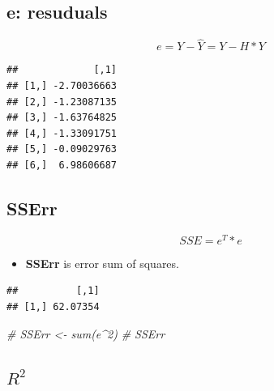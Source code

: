 \documentclass[
]{article}
\newenvironment{Shaded}{\begin{snugshade}}{\end{snugshade}}
\newcommand{\CommentTok}[1]{\textcolor[rgb]{0.56,0.35,0.01}{\textit{#1}}}
\newcommand{\KeywordTok}[1]{\textcolor[rgb]{0.13,0.29,0.53}{\textbf{#1}}}
\newcommand{\NormalTok}[1]{#1}
\newcommand{\OperatorTok}[1]{\textcolor[rgb]{0.81,0.36,0.00}{\textbf{#1}}}
\newcommand{\StringTok}[1]{\textcolor[rgb]{0.31,0.60,0.02}{#1}}
\providecommand{\tightlist}{%
  \setlength{\itemsep}{0pt}\setlength{\parskip}{0pt}}
\begin{document}
\hypertarget{e-resuduals}{%
\subsection{e: resuduals}\label{e-resuduals}}

\[
e = Y -\hat{Y} = Y - H * Y
\]

\begin{Shaded}
\end{Shaded}

\begin{verbatim}
##             [,1]
## [1,] -2.70036663
## [2,] -1.23087135
## [3,] -1.63764825
## [4,] -1.33091751
## [5,] -0.09029763
## [6,]  6.98606687
\end{verbatim}

\hypertarget{sserr}{%
\subsection{SSErr}\label{sserr}}

\[
SSE = e^T * e
\]

\begin{itemize}
\tightlist
\item
  \textbf{SSErr} is error sum of squares.
\end{itemize}

\begin{Shaded}
\end{Shaded}

\begin{verbatim}
##          [,1]
## [1,] 62.07354
\end{verbatim}

\begin{Shaded}
\begin{Highlighting}[]
\CommentTok{# SSErr <- sum(e^2)}
\CommentTok{# SSErr}
\end{Highlighting}
\end{Shaded}

\hypertarget{r2}{%
\subsection{\texorpdfstring{\textbf{\(R^2\)}}{R\^{}2}}\label{r2}}
\end{document}
